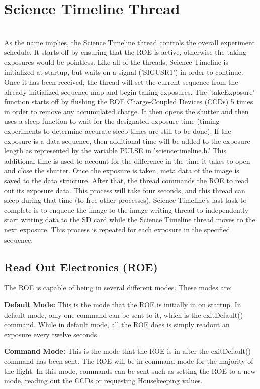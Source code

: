 %
\section{Science Timeline Thread}
\hrulefill
\\
As the name implies, the Science Timeline thread controls the overall experiment schedule. It starts off by ensuring that the ROE is active, otherwise the taking exposures would be pointless. Like all of the threads, Science Timeline is initialized at startup, but waits on a signal ('SIGUSR1') in order to continue. Once it has been received, the thread will set the current sequence from the already-initialized sequence map and begin taking exposures. The 'takeExposure' function starts off by flushing the ROE Charge-Coupled Devices (CCDs) 5 times in order to remove any accumulated charge. It then opens the shutter and then uses a sleep function to wait for the designated exposure time (timing experiments to determine accurate sleep times are still to be done). If the exposure is a data sequence, then additional time will be added to the exposure length as represented by the variable PULSE in 'sciencetimeline.h.' This additional time is used to account for the difference in the time it takes to open and close the shutter. 
Once the exposure is taken, meta data of the image is saved to the data structure. After that, the thread commands the ROE to read out its exposure data. This process will take four seconds, and this thread can sleep during that time (to free other processes). Science Timeline's last task to complete is to enqueue the image to the image-writing thread to independently start writing data to the SD card while the Science Timeline thread moves to the next exposure. 
This process is repeated for each exposure in the specified sequence.

\subsection{Read Out Electronics (ROE)}

The ROE is capable of being in several different modes. These modes are:

\textbf{Default Mode:}
This is the mode that the ROE is initially in on startup. In default mode, only one command can be sent to it, which is the exitDefault() command. While in default mode, all the ROE does is simply readout an exposure every twelve seconds.

\textbf{Command Mode:}
This is the mode that the ROE is in after the exitDefault() command has been sent. The ROE will be in command mode for the majority of the flight. In this mode, commands can be sent such as setting the ROE to a new mode, reading out the CCDs or requesting Housekeeping values. 

